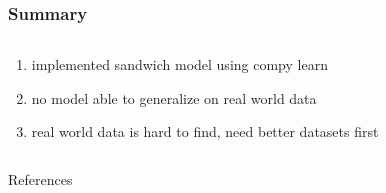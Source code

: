 \documentclass[aspectratio=169,xcolor=table]{beamer}
\begin{document}
\begin{frame}\frametitle{Summary}
  \begin{columns}
    \begin{column}{0.5\textwidth}
      \vspace{-2.5em}
      \begin{enumerate}
        \itemsep1em
        \item implemented sandwich model using compy learn
        \item no model able to generalize on real world data
        \item real world data is hard to find, need better datasets first
      \end{enumerate}
    \end{column}
    \begin{column}{0.5\textwidth}
    \end{column}
  \end{columns}
\end{frame}

\appendix

\begin{frame}[allowframebreaks]{References}
  \printbibliography
\end{frame}
\end{document}
